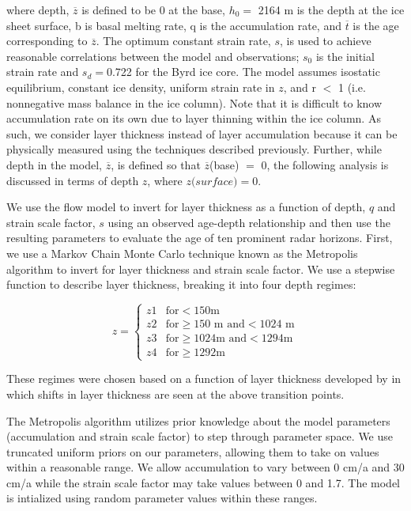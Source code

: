 \documentclass[draft,jgrga]{agutex}
\begin{document}
\begin{article}
where depth, $\overline{z}$ is defined to be 0 at the base, $h_0 =$ 2164 m is the depth at the ice sheet surface, b is basal melting rate, q is the accumulation rate, and $\overline{t}$ is the age corresponding to $\overline{z}$. The optimum constant strain rate, $\textit{s}$, is used to achieve reasonable correlations between the model and observations; $s_0$ is the initial strain rate and $s_d=$0.722 for the Byrd ice core. The model assumes isostatic equilibrium, constant ice density, uniform strain rate in $\textit{z}$, and r $<$ 1 (i.e. nonnegative mass balance in the ice column). Note that it is difficult to know accumulation rate on its own due to layer thinning within the ice column. As such, we consider layer thickness instead of layer accumulation because it can be physically measured using the techniques described previously. Further, while depth in the model, $\overline{z}$, is defined so that $\overline{z}$(base) $=$ 0, the following analysis is discussed in terms of depth $\textit{z}$, where $\textit{z(surface)} = 0$.

We use the flow model to invert for layer thickness as a function of depth, $\textit{q}$ and strain scale factor, $\textit{s}$ using an observed age-depth relationship and then use the resulting parameters to evaluate the age of ten prominent radar horizons. First, we use a Markov Chain Monte Carlo technique known as the Metropolis algorithm to invert for layer thickness and strain scale factor. We use a stepwise function to describe layer thickness, breaking it into four depth regimes:

\[
z = 
\begin{cases}
z1 & \text{for} < 150 \text{m} \\
z2 & \text{for} \ge 150 \text{ m and} < \text{1024 m} \\
z3 & \text{for} \ge 1024 \text{m and} < 1294 \text{m} \\
z4 & \text{for} \ge 1292 \text{m}
\end{cases}
\]



These regimes were chosen based on a function of layer thickness developed by \citet{hammer1994} in which shifts in layer thickness are seen at the above transition points.

The Metropolis algorithm utilizes prior knowledge about the model parameters (accumulation and strain scale factor) to step through parameter space. We use truncated uniform priors on our parameters, allowing them to take on values within a reasonable range. We allow accumulation to vary between 0 cm/a and 30 cm/a while the strain scale factor may take values between 0 and 1.7.  The model is intialized using random parameter values within these ranges.


\end{article}
\end{document}
